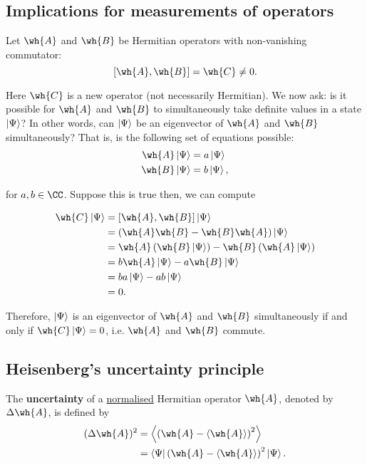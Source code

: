 \documentclass[12pt, a4paper]{article}
\begin{document}
\subsection{Implications for measurements of operators}

Let \(\wh{A}\) and \(\wh{B}\) be Hermitian operators with non-vanishing commutator:
\[[\wh{A},\wh{B}]=\wh{C} \neq 0.\]

Here \(\wh{C}\) is a new operator (not necessarily Hermitian). We now ask: is it possible for \(\wh{A}\) and \(\wh{B}\) to simultaneously take definite values in a state \(\ket{\Psi}\)? In other words, can \(\ket{\Psi}\) be an eigenvector of \(\wh{A}\) and \(\wh{B}\) simultaneously? That is, is the following set of equations possible:
\[\begin{aligned}
    \wh{A} \ket{\Psi} &= a \ket{\Psi} \\
    \wh{B} \ket{\Psi} &= b \ket{\Psi},
\end{aligned}\]

for \(a,b \in \CC\). Suppose this is true then, we can compute 

\[\begin{aligned}
    \wh{C} \ket{\Psi} &= [\wh{A},\wh{B}] \ket{\Psi} \\
    &= (\wh{A}\wh{B}- \wh{B}\wh{A})\ket{\Psi} \\
    &= \wh{A}\left(\wh{B}\ket{\Psi} \right)- \wh{B} \left(\wh{A}\ket{\Psi}\right) \\
    &= b\wh{A}\ket{\Psi} -a\wh{B}\ket{\Psi} \\
    &= ba\ket{\Psi}-ab\ket{\Psi} \\
    &=0.
\end{aligned}\]

Therefore, \(\ket{\Psi}\) is an eigenvector of \(\wh{A}\) and \(\wh{B}\) simultaneously if and only if \(\wh{C}\ket{\Psi}=0\), i.e. \(\wh{A}\) and \(\wh{B}\) commute.

\subsection{Heisenberg's uncertainty principle}

\begin{definition}
    The \textbf{uncertainty} of a \underline{normalised} Hermitian operator \(\wh{A}\), denoted by \(\Delta \wh{A}\), is defined by 
    \[\begin{aligned}
        ( \Delta \wh{A} )^2 &= \left\langle \left(\wh{A}-\langle \wh{A} \rangle\right)^2 \right\rangle \\
        &= \bra{\Psi} \left( \wh{A}-\langle \wh{A}\rangle \right)^2 \ket{\Psi}.
    \end{aligned}\]
\end{definition}
\end{document}
